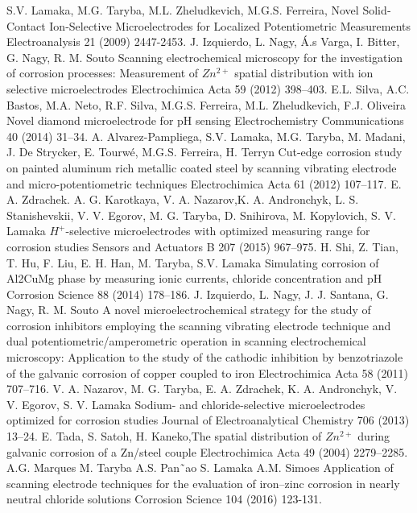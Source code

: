 \documentclass[3p]{elsarticle}
\begin{document}
\begin{thebibliography}{5}

S.V. Lamaka, M.G. Taryba, M.L. Zheludkevich, M.G.S. Ferreira, Novel Solid‐Contact Ion‐Selective Microelectrodes for Localized Potentiometric Measurements Electroanalysis 21 (2009) 2447-2453.
J. Izquierdo, L. Nagy, Á.s Varga, I. Bitter, G. Nagy, R. M. Souto Scanning electrochemical microscopy for the investigation of corrosion processes: Measurement of  $Zn^{2+}$ spatial distribution with ion selective microelectrodes Electrochimica Acta 59 (2012) 398–403. 
E.L. Silva, A.C. Bastos, M.A. Neto, R.F. Silva, M.G.S. Ferreira, M.L. Zheludkevich, F.J. Oliveira Novel diamond microelectrode for pH sensing Electrochemistry Communications 40 (2014) 31–34.
A. Alvarez-Pampliega, S.V. Lamaka, M.G. Taryba, M. Madani, J. De Strycker, E. Tourwé, M.G.S. Ferreira, H. Terryn Cut-edge corrosion study on painted aluminum rich metallic coated steel by scanning vibrating electrode and micro-potentiometric techniques Electrochimica Acta 61 (2012) 107–117.	
E. A. Zdrachek. A. G. Karotkaya, V. A. Nazarov,K. A. Andronchyk, L. S. Stanishevskii, V. V. Egorov, M. G. Taryba, D. Snihirova, M. Kopylovich, S. V. Lamaka $H^{+}$-selective microelectrodes with optimized measuring range for corrosion studies  Sensors and Actuators B 207 (2015) 967–975.
H. Shi, Z. Tian, T. Hu, F. Liu, E. H. Han, M. Taryba, S.V. Lamaka Simulating corrosion of Al2CuMg phase by measuring ionic currents, chloride concentration and pH Corrosion Science 88 (2014) 178–186.
J. Izquierdo, L. Nagy, J. J. Santana, G. Nagy, R. M. Souto A novel microelectrochemical strategy for the study of corrosion inhibitors employing the scanning vibrating electrode technique and dual potentiometric/amperometric operation in scanning electrochemical microscopy: Application to the study of the cathodic inhibition by benzotriazole of the galvanic corrosion of copper coupled to iron Electrochimica Acta 58 (2011) 707–716.
V. A. Nazarov, M. G. Taryba, E. A. Zdrachek, K. A. Andronchyk, V. V. Egorov, S. V. Lamaka Sodium- and chloride-selective microelectrodes optimized for corrosion studies Journal of Electroanalytical Chemistry 706 (2013) 13–24.
E. Tada, S. Satoh, H. Kaneko,The spatial distribution of $Zn^{2+}$ during galvanic corrosion of a Zn/steel couple Electrochimica Acta 49 (2004) 2279–2285.
A.G. Marques M. Taryba A.S. Pan˜ao S. Lamaka A.M. Simoes Application of scanning electrode techniques for the evaluation of iron–zinc corrosion in nearly neutral chloride solutions Corrosion Science 104 (2016) 123-131.

\end{thebibliography}
\end{document}
